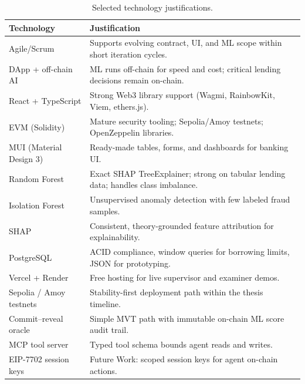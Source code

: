 \begin{table}[H]
\centering
\caption[Selected technology justifications]{Selected technology justifications.}
\label{tab:tech-justification-selected}
\small
\begin{tabular}{@{}p{3.2cm}p{9.8cm}@{}}
\toprule
\tableheadcolor
\textbf{Technology} & \textbf{Justification} \\
\midrule
Agile/Scrum & Supports evolving contract, UI, and ML scope within short iteration cycles. \\
DApp + off-chain AI & ML runs off-chain for speed and cost; critical lending decisions remain on-chain. \\
React + TypeScript & Strong Web3 library support (Wagmi, RainbowKit, Viem, ethers.js). \\
EVM (Solidity) & Mature security tooling; Sepolia/Amoy testnets; OpenZeppelin libraries. \\
MUI (Material Design 3) & Ready-made tables, forms, and dashboards for banking UI. \\
Random Forest & Exact SHAP TreeExplainer; strong on tabular lending data; handles class imbalance. \\
Isolation Forest & Unsupervised anomaly detection with few labeled fraud samples. \\
SHAP & Consistent, theory-grounded feature attribution for explainability. \\
PostgreSQL & ACID compliance, window queries for borrowing limits, JSON for prototyping. \\
Vercel + Render & Free hosting for live supervisor and examiner demos. \\
Sepolia / Amoy testnets & Stability-first deployment path within the thesis timeline. \\
Commit--reveal oracle & Simple MVT path with immutable on-chain ML score audit trail. \\
MCP tool server & Typed tool schema bounds agent reads and writes. \\
EIP-7702 session keys & Future Work: scoped session keys for agent on-chain actions. \\
\bottomrule
\end{tabular}
\end{table}

